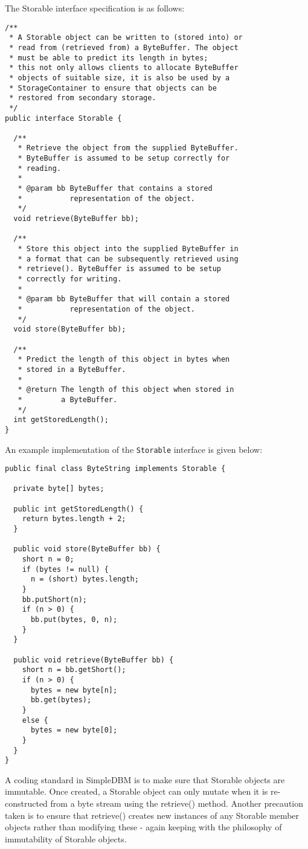 \documentclass[a4paper,draft,oneside]{book}
\begin{document}
The Storable interface specification is as follows:

\begin{verbatim}
/**
 * A Storable object can be written to (stored into) or 
 * read from (retrieved from) a ByteBuffer. The object 
 * must be able to predict its length in bytes;
 * this not only allows clients to allocate ByteBuffer 
 * objects of suitable size, it is also be used by a 
 * StorageContainer to ensure that objects can be
 * restored from secondary storage.
 */
public interface Storable {

  /**
   * Retrieve the object from the supplied ByteBuffer. 
   * ByteBuffer is assumed to be setup correctly for 
   * reading.
   * 
   * @param bb ByteBuffer that contains a stored 
   *           representation of the object.
   */
  void retrieve(ByteBuffer bb);

  /**
   * Store this object into the supplied ByteBuffer in 
   * a format that can be subsequently retrieved using 
   * retrieve(). ByteBuffer is assumed to be setup 
   * correctly for writing.
   * 
   * @param bb ByteBuffer that will contain a stored 
   *           representation of the object.
   */
  void store(ByteBuffer bb);

  /**
   * Predict the length of this object in bytes when 
   * stored in a ByteBuffer.
   * 
   * @return The length of this object when stored in 
   *         a ByteBuffer.
   */
  int getStoredLength();
}
\end{verbatim}

An example implementation of the \verb|Storable| interface is 
given below:

\begin{verbatim}
public final class ByteString implements Storable {
    
  private byte[] bytes;
    
  public int getStoredLength() {
    return bytes.length + 2;
  }
    
  public void store(ByteBuffer bb) {
    short n = 0;
    if (bytes != null) {
      n = (short) bytes.length;
    }
    bb.putShort(n);
    if (n > 0) {
      bb.put(bytes, 0, n);
    }
  }
    
  public void retrieve(ByteBuffer bb) {
    short n = bb.getShort();
    if (n > 0) {
      bytes = new byte[n];
      bb.get(bytes);
    }
    else {
      bytes = new byte[0];
    }
  }
}
\end{verbatim}

A coding standard in SimpleDBM is to make sure that Storable
objects are immutable. Once created, a Storable object can 
only mutate when it is re-constructed from a byte stream using the
retrieve() method. Another precaution taken is to ensure that
retrieve() creates new instances of any Storable member objects rather
than modifying these - again keeping with the philosophy of immutability
of Storable objects. 
\end{document}

